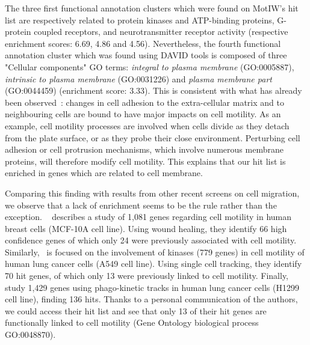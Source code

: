 The three first functional annotation clusters which were found on
MotIW's hit list are respectively related to protein kinases and
ATP-binding proteins, G-protein coupled receptors, and
neurotransmitter receptor activity (respective enrichment scores: 6.69, 4.86 and 4.56). Nevertheless, the fourth
functional annotation cluster which was found using DAVID tools is
composed of three "Cellular components" GO terms: \textit{integral to
  plasma membrane} (GO:0005887), \textit{intrinsic to plasma membrane}
(GO:0031226) and \textit{plasma membrane part} (GO:0044459) (enrichment score: 3.33). This is
consistent with what has already been observed~\cite{pmid18213366}:
changes in cell adhesion to the extra-cellular matrix and to
neighbouring cells are bound to have major impacts on cell
motility. As an example, cell motility processes are involved when
cells divide as they detach from the plate surface, or as they probe
their close environment. Perturbing cell adhesion or cell protrusion
mechanisms, which involve numerous membrane proteins, will therefore
modify cell motility. This explains that our hit list is enriched in
genes which are related to cell membrane. 

%

Comparing this finding with results from other recent screens on cell
migration, we observe that a lack of enrichment seems to be the rule
rather than the exception. ~\cite{pmid19160483} describes
a study of 1,081 genes regarding cell motility in human breast cells
(MCF-10A cell line). Using wound healing, they identify 66 high
confidence genes of which only 24 were previously associated with cell
motility. Similarly,~\cite{pmid21423205} is focused on the involvement
of kinases (779 genes) in cell motility of human lung cancer cells
(A549 cell line). Using single cell tracking, they identify 70 hit
genes, of which only 13 were previously linked to cell
motility. Finally,~\cite{pmid25774502} study 1,429 genes using
phago-kinetic tracks in human lung cancer cells (H1299 cell line),
finding 136 hits. Thanks to a personal communication of the authors,
we could access their hit list and see that only 13 of their hit genes
are functionally linked to cell motility (Gene Ontology biological
process GO:0048870). %


